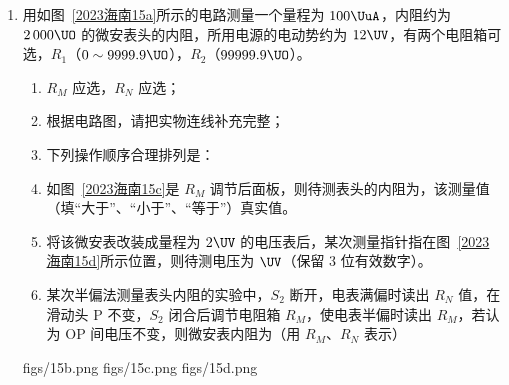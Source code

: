 \documentclass[\gkver]{gaokaozhenti}
\begin{document}
\begin{enumerate}
\item
用如图~\ref{2023海南15a}所示的电路测量一个量程为 $100 \UuA$，内阻约为 $2\,000 \UO$ 的微安表头的内阻，所用电源的电动势约为 $12 \UV$，有两个电阻箱可选，$R_{1}$（$0 \sim 9999.9 \UO$），$R_{2}$（$99999.9 \UO$）。

\begin{enumerate}
	\item
	$R_{M}$ 应选，$R_{N}$ 应选；
	\item
	根据电路图，请把实物连线补充完整；
	\item
	下列操作顺序合理排列是：
	\item
	如图~\ref{2023海南15c}是 $R_{M}$ 调节后面板，则待测表头的内阻为，该测量值（填“大于”、“小于”、“等于”）真实值。
	\item
	将该微安表改装成量程为 $2 \UV$ 的电压表后，某次测量指针指在图~\ref{2023海南15d}所示位置，则待测电压为 $\UV$（保留 3 位有效数字）。
	\item
	某次半偏法测量表头内阻的实验中，$S_{2}$ 断开，电表满偏时读出 $R_{N}$ 值，在滑动头 P 不变，$S_{2}$ 闭合后调节电阻箱 $R_{M}$，使电表半偏时读出 $R_{M}$，若认为 OP 间电压不变，则微安表内阻为（用 $R_{M}$、$R_{N}$ 表示）
\end{enumerate}
{figs/15b.png}
{figs/15c.png}
{figs/15d.png}
\end{enumerate}
\end{document}
